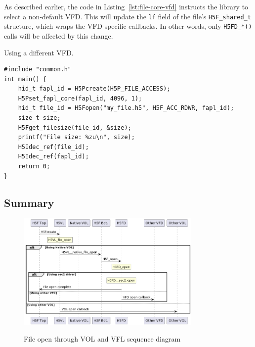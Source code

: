 As described earlier, the code in Listing~\ref{lst:file-core-vfd} instructs the library to select a non-default VFD. This will update the \texttt{lf} field of the file's \texttt{H5F\_shared\_t} structure, which wraps the VFD-specific callbacks. In other words, only \texttt{H5FD\_*()} calls will be affected by this change.

\begin{listing}
\centering
\caption{Using a different VFD.}
\label{lst:file-core-vfd}
\begin{verbatim}
#include "common.h"
int main() {
    hid_t fapl_id = H5Pcreate(H5P_FILE_ACCESS);
    H5Pset_fapl_core(fapl_id, 4096, 1);
    hid_t file_id = H5Fopen("my_file.h5", H5F_ACC_RDWR, fapl_id);
    size_t size;
    H5Fget_filesize(file_id, &size);
    printf("File size: %zu\n", size);
    H5Idec_ref(file_id);
    H5Idec_ref(fapl_id);
    return 0;
}
\end{verbatim}
\end{listing}

\subsection{Summary}

\begin{figure}
\centering
\includegraphics[width=0.80\textwidth]{images/tour-2-uml-vol.png}
\label{fig:tour-2-uml-vol}
\caption{File open through VOL and VFL sequence diagram}
\end{figure}

